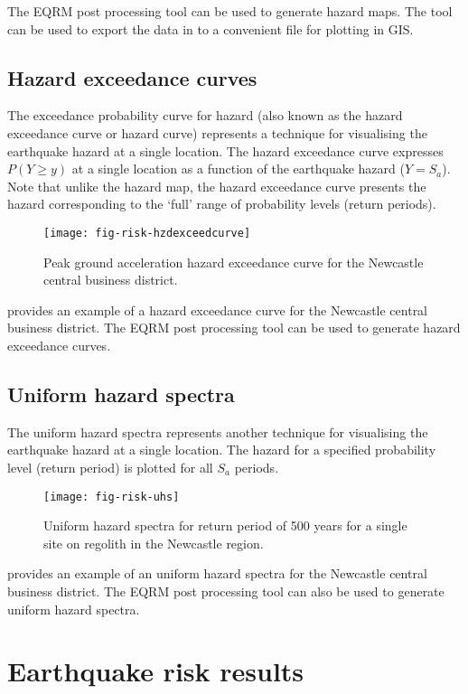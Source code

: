 The EQRM post processing tool   can
be used to generate hazard maps. The tool
 can be used to export the data
in  to a convenient
file for plotting in GIS.

\subsection{Hazard exceedance curves}

The exceedance probability curve for hazard (also known as the
hazard exceedance curve or hazard curve) represents a technique
for visualising the earthquake hazard at a single location. The
hazard exceedance curve expresses $P(Y \ge y)$ at a single
location as a function of the earthquake hazard ($Y = S_a$). Note
that unlike the hazard map, the hazard exceedance curve presents
the hazard corresponding to the `full' range of probability levels
(return periods).
\begin{figure}
\texttt{[image: fig-risk-hzdexceedcurve]}
\caption{Peak ground acceleration hazard exceedance curve for the
Newcastle central business district.}
\label{fig:risk-hzdexceedcurve}
\end{figure}
 provides an example of a hazard
exceedance curve for the Newcastle central business district. The
EQRM post processing tool  can
be used to generate hazard exceedance curves.

\subsection{Uniform hazard spectra}

The uniform hazard spectra represents another technique for
visualising the earthquake hazard at a single location. The hazard
for a specified probability level (return period) is plotted for
all $S_a$ periods.
\begin{figure}
\texttt{[image: fig-risk-uhs]}
\caption{Uniform hazard spectra for return period of 500 years for
a single site on regolith in the Newcastle region.}
\label{fig:risk-hazarduhs}
\end{figure}
 provides an example of an uniform hazard
spectra for the Newcastle central business district. The EQRM post
processing tool  can also be
used to generate uniform hazard spectra.

\section{Earthquake risk results}


